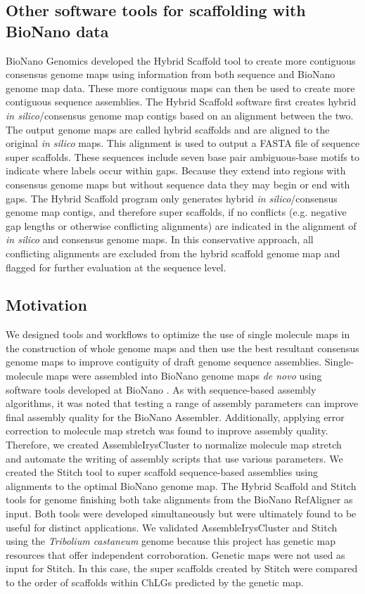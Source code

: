 \documentclass{bmcart}
\begin{document}
\subsection*{Other software tools for scaffolding with BioNano data}
BioNano Genomics developed the Hybrid Scaffold tool to create more contiguous consensus genome maps using information from both sequence and BioNano genome map data. These more contiguous maps can then be used to create more contiguous sequence assemblies. The Hybrid Scaffold software first creates hybrid \textit{in silico}/consensus genome map contigs based on an alignment between the two. The output genome maps are called hybrid scaffolds and are aligned to the original \textit{in silico} maps. This alignment is used to output a FASTA file of sequence super scaffolds. These sequences include seven base pair ambiguous-base motifs to indicate where labels occur within gaps. Because they extend into regions with consensus genome maps but without sequence data they may begin or end with gaps. The Hybrid Scaffold program only generates hybrid \textit{in silico}/consensus genome map contigs, and therefore super scaffolds, if no conflicts (e.g. negative gap lengths or otherwise conflicting alignments) are indicated in the alignment of \textit{in silico} and consensus genome maps. In this conservative approach, all conflicting alignments are excluded from the hybrid scaffold genome map and flagged for further evaluation at the sequence level.

\subsection*{Motivation}
We designed tools and workflows to optimize the use of single molecule maps in the construction of whole genome maps and then use the best resultant consensus genome maps to improve contiguity of draft genome sequence assemblies. Single-molecule maps were assembled into BioNano genome maps \textit{de novo} using software tools developed at BioNano \cite{BioNanoSV2014}. As with sequence-based assembly algorithms, it was noted that testing a range of assembly parameters can improve final assembly quality for the BioNano Assembler. Additionally, applying error correction to molecule map stretch was found to improve assembly quality. Therefore, we created AssembleIrysCluster to normalize molecule map stretch and automate the writing of assembly scripts that use various parameters. We created the Stitch tool to super scaffold sequence-based assemblies using alignments to the optimal BioNano genome map. The Hybrid Scaffold and Stitch tools for genome finishing both take alignments from the BioNano RefAligner as input. Both tools were developed simultaneously but were ultimately found to be useful for distinct applications. We validated AssembleIrysCluster and Stitch using the \textit{Tribolium castaneum} genome \cite{Beetle2008} because this project has genetic map resources \cite{BeetleGenMap2005} that offer independent corroboration. Genetic maps were not used as input for Stitch. In this case, the super scaffolds created by Stitch were compared to the order of scaffolds within ChLGs predicted by the genetic map.
\end{document}
